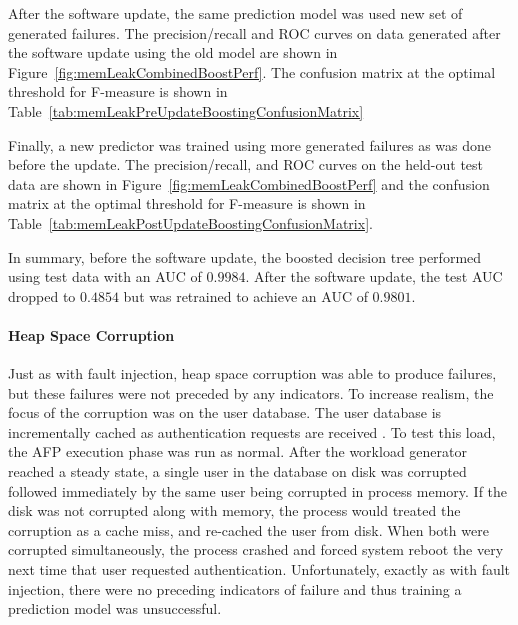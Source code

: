 \figMemLeakCombinedBoostPerf
\tabMemLeakPreUpdateBoostingConfusionMatrix

After the software update, the same prediction model was used new set of
generated failures.  The precision/recall and \ac{ROC} curves on data generated
after the software update using the old model are shown in
Figure~\ref{fig:memLeakCombinedBoostPerf}.  The confusion matrix at
the optimal threshold for F-measure is shown in
Table~\ref{tab:memLeakPreUpdateBoostingConfusionMatrix}

\tabMemLeakPostUpdateBoostingSameModelConfusionMatrix

Finally, a new predictor was trained using more generated failures as was done
before the update.  The precision/recall, and \ac{ROC} curves on the held-out
test data are shown in Figure~\ref{fig:memLeakCombinedBoostPerf} and the
confusion matrix at the optimal threshold for F-measure is shown in
Table~\ref{tab:memLeakPostUpdateBoostingConfusionMatrix}.

\tabMemLeakPostUpdateBoostingConfusionMatrix

In summary, before the software update, the boosted decision tree performed
using test data with an \ac{AUC} of $0.9984$.  After the software update, the
test \ac{AUC} dropped to $0.4854$ but was retrained to achieve an \ac{AUC} of
$0.9801$.

\paragraph{Heap Space Corruption}
Just as with fault injection, heap space corruption was able to produce
failures, but these failures were not preceded by any indicators.  To increase
realism, the focus of the corruption was on the user database.  The user
database is incrementally cached as authentication requests are received
\citep{russinovich2009}.  To test this load, the \ac{AFP} execution phase was
run as normal.  After the workload generator reached a steady state, a single
user in the database on disk was corrupted followed immediately by the same
user being corrupted in process memory.  If the disk was not corrupted along
with memory, the process would treated the corruption as a cache miss, and
re-cached the user from disk.  When both were corrupted simultaneously, the
process crashed and forced system reboot the very next time that user requested
authentication.  Unfortunately, exactly as with fault injection, there were no
preceding indicators of failure and thus training a prediction model was
unsuccessful.

